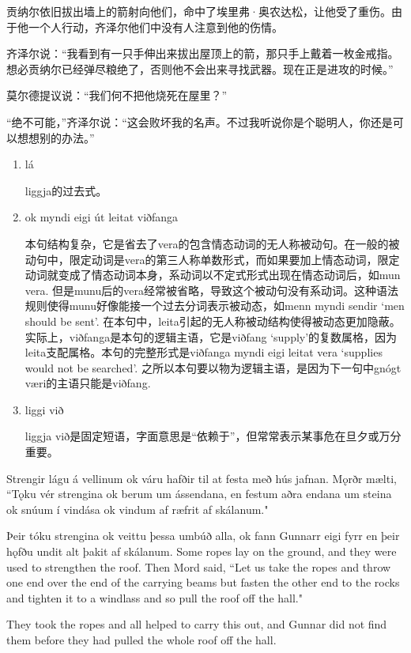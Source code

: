 \begin{translation*}{}
  贡纳尔依旧拔出墙上的箭射向他们，命中了埃里弗·奥农达松，让他受了重伤。由于他一个人行动，齐泽尔他们中没有人注意到他的伤情。

  齐泽尔说：“我看到有一只手伸出来拔出屋顶上的箭，那只手上戴着一枚金戒指。想必贡纳尔已经弹尽粮绝了，否则他不会出来寻找武器。现在正是进攻的时候。”

  莫尔德提议说：“我们何不把他烧死在屋里？”

  “绝不可能，”齐泽尔说：“这会败坏我的名声。不过我听说你是个聪明人，你还是可以想想别的办法。”
\end{translation*}
\begin{grammar*}{}
  \begin{enumerate}[leftmargin=*]
    \item lá

          liggja的过去式。
    \item ok myndi eigi út leitat viðfanga

          本句结构复杂，它是省去了vera的包含情态动词的无人称被动句。在一般的被动句中，限定动词是vera的第三人称单数形式，而如果要加上情态动词，限定动词就变成了情态动词本身，系动词以不定式形式出现在情态动词后，如mun vera. 但是munu后的vera经常被省略，导致这个被动句没有系动词。这种语法规则使得munu好像能接一个过去分词表示被动态，如menn myndi sendir `men should be sent'. 在本句中，leita引起的无人称被动结构使得被动态更加隐蔽。实际上，viðfanga是本句的逻辑主语，它是viðfang `supply'的复数属格，因为leita支配属格。本句的完整形式是viðfanga myndi eigi leitat vera `supplies would not be searched'. 之所以本句要以物为逻辑主语，是因为下一句中gnógt væri的主语只能是viðfang.

    \item liggi við

          liggja við是固定短语，字面意思是“依赖于”，但常常表示某事危在旦夕或万分重要。
  \end{enumerate}
\end{grammar*}
\begin{paracol}{2}
  Strengir lágu á vellinum ok váru hafðir til at festa með hús jafnan. Mǫrðr mælti, ``Tǫku vér strengina ok berum um ássendana, en festum aðra endana um steina ok snúum í vindása ok vindum af ræfrit af skálanum."

  Þeir tóku strengina ok veittu þessa umbúð alla, ok fann Gunnarr eigi fyrr en þeir hǫfðu undit alt þakit af skálanum.
  \switchcolumn
  Some ropes lay on the ground, and they were used to strengthen the roof. Then Mord said, ``Let us take the ropes and throw one end over the end of the carrying beams but fasten the other end to the rocks and tighten it to a windlass and so pull the roof off the hall."

  They took the ropes and all helped to carry this out, and Gunnar did not find them before they had pulled the whole roof off the hall.
\end{paracol}
